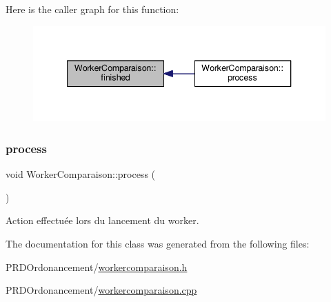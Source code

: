 Here is the caller graph for this function\+:\nopagebreak
\begin{figure}[H]
\begin{center}
\leavevmode
\includegraphics[width=340pt]{classWorkerComparaison_a22ed9afba5f29d89a014b2b895d995b2_icgraph}
\end{center}
\end{figure}
\mbox{\label{classWorkerComparaison_ac62afd6b36f0c1590e5f3878334a9928}} 
\subsubsection{\texorpdfstring{process}{process}}
{\footnotesize\ttfamily void Worker\+Comparaison\+::process (\begin{DoxyParamCaption}{ }\end{DoxyParamCaption})\hspace{0.3cm}{\ttfamily [slot]}}



Action effectuée lors du lancement du worker. 



The documentation for this class was generated from the following files\+:\begin{DoxyCompactItemize}
\item 
P\+R\+D\+Ordonancement/\hyperlink{workercomparaison_8h}{workercomparaison.\+h}\item 
P\+R\+D\+Ordonancement/\hyperlink{workercomparaison_8cpp}{workercomparaison.\+cpp}\end{DoxyCompactItemize}
